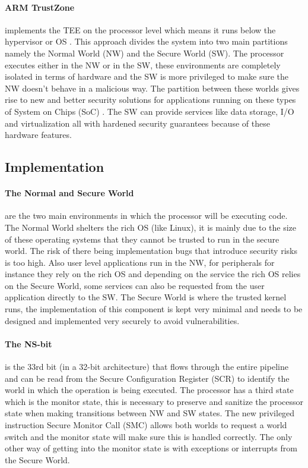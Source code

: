 \paragraph*{ARM TrustZone}
\cite{TrustZone} implements the TEE on the processor level which means it runs below the hypervisor or OS \cite{PintoSandro2019DATA}. This approach divides the system into two main partitions namely the Normal World (NW) and the Secure World (SW). The processor executes either in the NW or in the SW, these environments are completely isolated in terms of hardware and the SW is more privileged to make sure the NW doesn't behave in a malicious way. The partition between these worlds gives rise to new and better security solutions for applications running on these types of System on Chips (SoC) \cite{LentzMatthew2018SATM} \cite{EskandarianSaba2018FPUS} \cite{ChangRui2017Mapm} \cite{FerraiuoloAndrew2017KUvt}. The SW can provide services like data storage, I/O and virtualization all with hardened security guarantees because of these hardware features.  

\subsection*{Implementation}

\paragraph*{The Normal and Secure World}
are the two main environments in which the processor will be executing code. The Normal World shelters the rich OS (like Linux), it is mainly due to the size of these operating systems that they cannot be trusted to run in the secure world. The risk of there being implementation bugs that introduce security risks is too high. Also user level applications run in the NW, for peripherals for instance they rely on the rich OS and depending on the service the rich OS relies on the Secure World, some services can also be requested from the user application directly to the SW. The Secure World is where the trusted kernel runs, the implementation of this component is kept very minimal and needs to be designed and implemented very securely to avoid vulnerabilities.

\paragraph*{The NS-bit}
is the 33rd bit (in a 32-bit architecture) that flows through the entire pipeline and can be read from the Secure Configuration Register (SCR) to identify the world in which the operation is being executed. The processor has a third state which is the monitor state, this is necessary to preserve and sanitize the processor state when making transitions between NW and SW states. The new privileged instruction Secure Monitor Call (SMC) allows both worlds to request a world switch and the monitor state will make sure this is handled correctly. The only other way of getting into the monitor state is with exceptions or interrupts from the Secure World.

